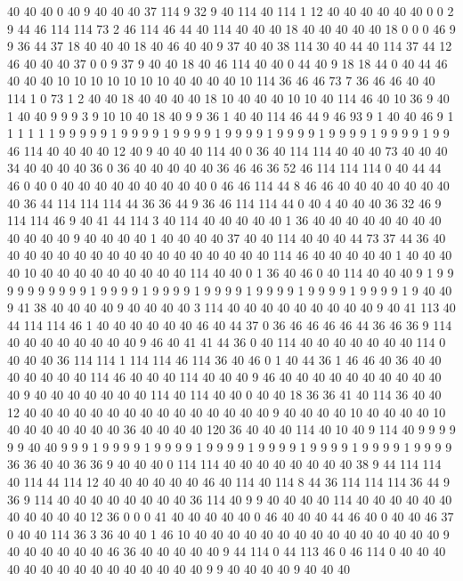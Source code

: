 40 40 40 0 40 9 40 40 40 37 114 9 32 9 40 114 40 114 1 12
40 40 40 40 40 40 0 0 2 9 44 46 114 114 73 2 46 114 46 44
40 114 40 40 40 18 40 40 40 40 40 18 0 0 0 46 9 9 36 44
37 18 40 40 40 18 40 46 40 40 9 37 40 40 38 114 30 40 44 40
114 37 44 12 46 40 40 40 37 0 0 9 37 9 40 40 18 40 46 114
40 40 0 44 40 9 18 18 44 0 40 44 46 40 40 40 10 10 10 10
10 10 10 40 40 40 40 10 114 36 46 46 73 7 36 46 46 40 40 114
1 0 73 1 2 40 40 18 40 40 40 40 18 10 40 40 40 10 10 40
114 46 40 10 36 9 40 1 40 40 9 9 9 3 9 10 10 40 18 40
9 9 36 1 40 40 114 46 44 9 46 93 9 1 40 40 46 9 1 1
1 1 1 1 9 9 9 9 9 1 9 9 9 9 1 9 9 9 9 1
9 9 9 9 1 9 9 9 9 1 9 9 9 9 1 9 9 9 9 1
9 9 46 114 40 40 40 40 12 40 9 40 40 40 114 40 0 36 40 114
114 40 40 40 73 40 40 40 34 40 40 40 40 36 0 36 40 40 40 40
40 36 46 46 36 52 46 114 114 114 0 40 44 44 46 0 40 0 40 40
40 40 40 40 40 40 40 0 46 46 114 44 8 46 46 40 40 40 40 40
40 40 40 36 44 114 114 114 44 36 36 44 9 36 46 114 114 44 0 40
4 40 40 40 36 32 46 9 114 114 46 9 40 41 44 114 3 40 114 40
40 40 40 40 1 36 40 40 40 40 40 40 40 40 40 40 40 40 9 40
40 40 40 1 40 40 40 40 37 40 40 114 40 40 40 44 73 37 44 36
40 40 40 40 40 40 40 40 40 40 40 40 40 40 40 40 40 114 46 40
40 40 40 40 1 40 40 40 40 10 40 40 40 40 40 40 40 40 40 114
40 40 0 1 36 40 46 0 40 114 40 40 40 9 1 9 9 9 9 9
9 9 9 9 9 1 9 9 9 9 1 9 9 9 9 1 9 9 9 9
1 9 9 9 9 1 9 9 9 9 1 9 9 9 9 1 9 40 40 9
41 38 40 40 40 40 9 40 40 40 40 3 114 40 40 40 40 40 40 40
40 40 9 40 41 113 40 44 114 114 46 1 40 40 40 40 40 40 46 40
44 37 0 36 46 46 46 46 44 36 46 36 9 114 40 40 40 40 40 40
40 40 9 46 40 41 41 44 36 0 40 114 40 40 40 40 40 40 40 114
0 40 40 40 36 114 114 1 114 114 46 114 36 40 46 0 1 40 44 36
1 46 46 40 36 40 40 40 40 40 40 40 114 46 40 40 40 114 40 40
40 9 46 40 40 40 40 40 40 40 40 40 40 40 9 40 40 40 40 40
40 40 114 40 114 40 40 0 40 40 18 36 36 41 40 114 36 40 40 12
40 40 40 40 40 40 40 40 40 40 40 40 40 40 40 9 40 40 40 40
10 40 40 40 40 10 40 40 40 40 40 40 40 36 40 40 40 40 120 36
40 40 40 114 40 10 40 9 114 40 9 9 9 9 9 9 40 40 9 9
9 1 9 9 9 9 1 9 9 9 9 1 9 9 9 9 1 9 9 9
9 1 9 9 9 9 1 9 9 9 9 1 9 9 9 9 36 36 40 40
36 36 9 40 40 40 0 114 114 40 40 40 40 40 40 40 40 38 9 44
114 114 40 114 44 114 12 40 40 40 40 40 40 46 40 114 40 114 8 44
36 114 114 114 36 44 9 36 9 114 40 40 40 40 40 40 40 40 36 114
40 9 9 40 40 40 40 114 40 40 40 40 40 40 40 40 40 40 40 12
36 0 0 0 41 40 40 40 40 40 0 46 40 40 40 44 46 40 0 40
40 46 37 0 40 40 114 36 3 36 40 40 1 46 10 40 40 40 40 40
40 40 40 40 40 40 40 40 40 40 9 40 40 40 40 40 40 46 36 40
40 40 40 40 9 44 114 0 44 113 46 0 46 114 0 40 40 40 40 40
40 40 40 40 40 40 40 40 40 40 9 9 40 40 40 40 9 40 40 40
